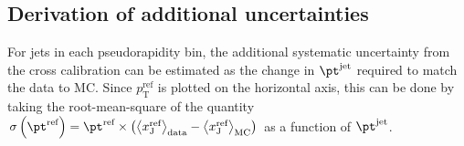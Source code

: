 \documentclass[NOTE, atlasdraft=true, texlive=2016, USenglish]{\ATLASLATEXPATH atlasdoc}
\begin{document}
\subsection{Derivation of additional uncertainties}
For jets in each pseudorapidity bin, the additional systematic uncertainty from the cross calibration can be estimated as the change in $\pt^{\text{jet}}$ required to match the data to MC. Since $p_{\text{T}}^{\text{ref}}$ is plotted on the horizontal axis, this can be done by taking the root-mean-square of the quantity $\sigma \left(\pt^{\text{ref}}\right) = \pt^{\text{ref}} \times\left( \left< x_{\text{J}}^{\text{ref}} \right>_{\text{data}} - \left< x_{\text{J}}^{\text{ref}} \right>_{\text{MC}} \right)$ as a function of $\pt^{\text{jet}}$.

\begin{figure}[htbp]
	\centering
	 \\
\end{figure}
\end{document}

